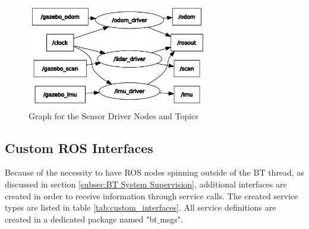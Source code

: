 \begin{figure}[ht]
	\centering
	\includegraphics[width=0.7\textwidth]{images/rqt_graph_sensor_drivers.png}
	\caption{Graph for the Sensor Driver Nodes and Topics}
	\label{fig:rqt_graph}
\end{figure}

\subsection{Custom ROS Interfaces}

Because of the necessity to have ROS nodes spinning outside of the BT thread, as discussed in section \ref{subsec:BT System Supervision}, additional interfaces are created in order to receive information through service calls. The created service types are listed in table \ref{tab:custom_interfaces}. All service definitions are created in a dedicated package named "bt$\_$msgs". 

\begin{table}[ht]
	\centering
	\caption{Implemented Custom Services}
	\label{tab:custom_interfaces}
	\renewcommand{\arraystretch}{1.5}
\end{table}
